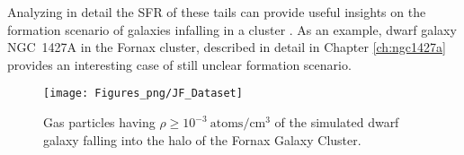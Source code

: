 Analyzing in detail the SFR of these tails can provide useful insights on the formation scenario of galaxies infalling in a cluster \cite{Ebeling2013}.
As an example, dwarf galaxy NGC~1427A in the Fornax cluster, described in detail in Chapter \ref{ch:ngc1427a} provides an interesting case of still unclear formation scenario.
\begin{figure}
    \centering
    \texttt{[image: Figures\_png/JF\_Dataset]}
    \caption{Gas particles having $\rho \ge 10^{-3} ~ \mathrm{atoms/cm^3}$ of the simulated dwarf galaxy falling into the halo of the Fornax Galaxy Cluster.}
    \label{fig:JF_Dataset}
\end{figure}


